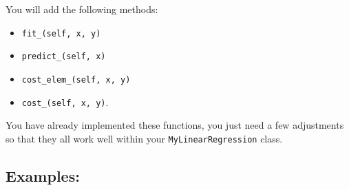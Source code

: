 \documentclass[]{article}
\begin{document}
You will add the following methods:

\begin{itemize}
\item
  \texttt{fit\_(self,\ x,\ y)}
\item
  \texttt{predict\_(self,\ x)}
\item
  \texttt{cost\_elem\_(self,\ x,\ y)}
\item
  \texttt{cost\_(self,\ x,\ y)}.
\end{itemize}

You have already implemented these functions, you just need a few
adjustments so that they all work well within your
\texttt{MyLinearRegression} class.

\hypertarget{examples-5}{%
\subsection{Examples:}\label{examples-5}}
\end{document}
